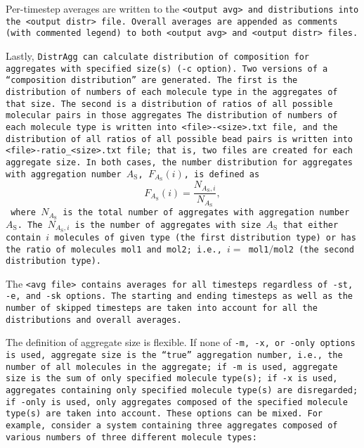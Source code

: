 Per-timestep averages are written to the \tt{<output avg>} and  distributions
into the \tt{<output distr>} file. Overall averages are appended as comments
(with commented legend) to both \tt{<output avg>} and \tt{<output distr>} files.

Lastly, \tt{DistrAgg} can calculate distribution of composition for aggregates
with specified size(s) (\tt{-c} option). Two versions of a \enquote{composition
distribution} are generated. The first is the distribution of numbers of each
molecule type in the aggregates of that size. The second is a distribution of
ratios of all possible molecular pairs in those aggregates The distribution of
numbers of each molecule type is written into \tt{<file>-<size>.txt} file, and
the distribution of all ratios of all possible bead pairs is written into
\tt{<file>-ratio_<size>.txt} file; that is, two files are created for each
aggregate size. In both cases, the number distribution for aggregates with
aggregation number $A_\text{S}$, $F_{A_\text{S}}(i)$, is defined as
%
\begin{equation}
  F_{A_\text{S}}(i) = \frac{N_{A_\text{S},i}}{N_{A_\text{S}}},
\end{equation}
%
where $N_{A_\text{S}}$ is the total number of
aggregates with aggregation number $A_\text{S}$. The
$N_{A_\text{S},i}$ is the number of aggregates with size $A_\text{S}$ that
either contain $i$ molecules of given type (the first distribution type) or has
the ratio of molecules \tt{mol1} and \tt{mol2}; i.e., $i=$ \tt{mol1}$/$\tt{mol2}
(the second distribution type).

The \tt{<avg file>} contains averages for all timesteps regardless of \tt{-st},
\tt{-e}, and \tt{-sk} options. The starting and ending timesteps as well as the
number of skipped timesteps are taken into account for all the distributions and
overall averages.

The definition of aggregate size is flexible. If none of \tt{-m}, \tt{-x}, or
\tt{-only} options is used, aggregate size is the \enquote{true} aggregation
number, i.e., the number of all molecules in the aggregate; if \tt{-m} is used,
aggregate size is the sum of only specified molecule type(s); if \tt{-x} is
used, aggregates containing only specified molecule type(s) are disregarded; if
\tt{-only} is used, only aggregates composed of the specified molecule type(s)
are taken into account. These options can be mixed. For example, consider a
system containing three aggregates composed of various numbers of three
different molecule types:

